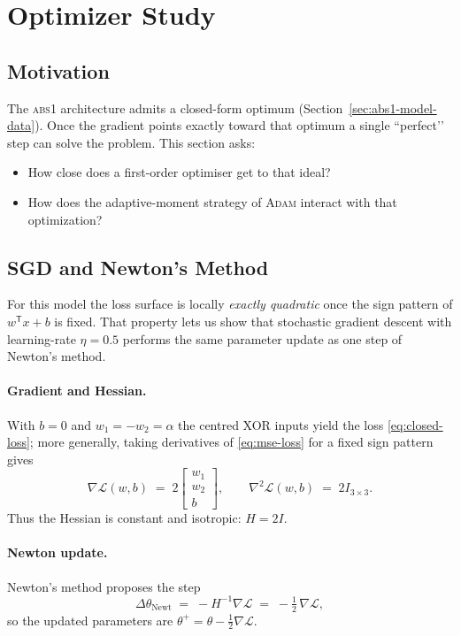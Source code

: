 ﻿%
\section{Optimizer Study}
\label{sec:abs1-optim}

\subsection*{Motivation}

The \textsc{abs1} architecture admits a closed-form optimum (Section~\ref{sec:abs1-model-data}).  
Once the gradient points exactly toward that optimum a single ``perfect’’ step can solve the problem.  
This section asks:

\begin{itemize}
    \item How close does a first-order optimiser get to that ideal?
    \item How does the adaptive-moment strategy of \textsc{Adam} interact with that optimization?
\end{itemize}

\subsection*{SGD and Newton’s Method}
\label{sec:sgd-newton}

For this model the loss surface is locally \emph{exactly quadratic} once the
sign pattern of $w^{\mathsf T}x+b$ is fixed.  That property lets us show that
stochastic gradient descent with learning-rate $\eta=0.5$ performs the same
parameter update as one step of Newton’s method.

\paragraph{Gradient and Hessian.}
With $b=0$ and $w_1=-w_2=\alpha$ the centred XOR inputs yield the loss
\eqref{eq:closed-loss}; more generally, taking derivatives of
\eqref{eq:mse-loss} for a fixed sign pattern gives
\[
    \nabla\! \mathcal L(w,b) \;=\; 2\begin{bmatrix}w_1\\ w_2\\ b\end{bmatrix},
    \qquad
    \nabla^2\! \mathcal L(w,b) \;=\; 2I_{3\times3}.
\]
Thus the Hessian is constant and isotropic: \(H = 2I\).

\paragraph{Newton update.}
Newton’s method proposes the step
\[
    \Delta\theta_{\text{Newt}}
    \;=\;
    -H^{-1}\nabla\! \mathcal L
    \;=\;
    -\tfrac12\,\nabla\! \mathcal L,
\]
so the updated parameters are
\(
    \theta^{+} = \theta - \tfrac12 \nabla\! \mathcal L.
\)

